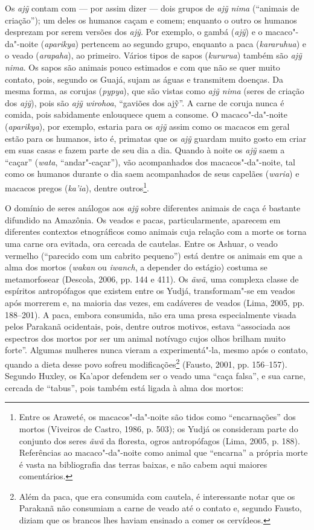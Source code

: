 Os \emph{ajỹ} contam com --- por assim dizer --- dois grupos de \emph{ajỹ
nima} (``animais de criação''); um deles os humanos caçam e comem;
enquanto o outro os humanos desprezam por serem versões dos \emph{ajỹ}.
Por exemplo, o gambá (\emph{ajỹ}) e o macaco"-da"-noite (\emph{aparikya})
pertencem ao segundo grupo, enquanto a paca (\emph{kararuhua}) e o veado
(\emph{arapaha}), ao primeiro. Vários tipos de sapos (\emph{kururua})
também são \emph{ajỹ nima}. Os sapos são animais pouco estimados e com
que não se quer muito contato, pois, segundo os Guajá, sujam as águas e
transmitem doenças. Da mesma forma, as corujas (\emph{pypya}), que são
vistas como \emph{ajỹ nima} (seres de criação dos \emph{ajỹ}), pois são
\emph{ajỹ wirohoa}, ``gaviões dos ajỹ''. A carne de coruja nunca é comida,
pois sabidamente enlouquece quem a consome. O macaco"-da"-noite
(\emph{aparikya}), por exemplo, estaria para os \emph{ajỹ} assim como os
macacos em geral estão para os humanos, isto é, primatas que os
\emph{ajỹ} guardam muito gosto em criar em suas casas e fazem parte de
seu dia a dia. Quando à noite os \emph{ajỹ} saem a ``caçar'' (\emph{wata},
``andar"-caçar''), vão acompanhados dos macacos"-da"-noite, tal como os
humanos durante o dia saem acompanhados de seus capelães (\emph{waria})
e macacos pregos (\emph{ka'ia}), dentre outros\footnote{Entre os
  Araweté, os macacos"-da"-noite são tidos como ``encarnações'' dos mortos
  (Viveiros de Castro, 1986, p. 503); os Yudjá os consideram parte do
  conjunto dos seres \emph{ãwã} da floresta, ogros antropófagos (Lima,
  2005, p. 188). Referências ao macaco"-da"-noite como animal que ``encarna'' a
  própria morte é vasta na bibliografia das terras baixas, e não cabem
  aqui maiores comentários.}.

O domínio de seres análogos aos \emph{ajỹ} sobre diferentes animais de
caça é bastante difundido na Amazônia. Os veados e pacas,
particularmente, aparecem em diferentes contextos etnográficos como
animais cuja relação com a morte os torna uma carne ora evitada, ora
cercada de cautelas. Entre os Ashuar, o veado vermelho (``parecido com um
cabrito pequeno'') está dentre os animais em que a alma dos mortos
(\emph{wakan} ou \emph{iwanch}, a depender do estágio) costuma se
metamorfosear (Descola, 2006, pp. 144 e 411). Os \emph{ãwã}, uma complexa
classe de espíritos antropófagos que existem entre os Yudjá,
transformam"-se em veados após morrerem e, na maioria das vezes, em
cadáveres de veados (Lima, 2005, pp. 188--201). A paca, embora consumida,
não era uma presa especialmente visada pelos Parakanã ocidentais, pois,
dentre outros motivos, estava ``associada aos espectros dos mortos por
ser um animal notívago cujos olhos brilham muito forte''. Algumas
mulheres nunca vieram a experimentá"-la, mesmo após o contato, quando a
dieta desse povo sofreu modificações\footnote{Além da paca, que era
  consumida com cautela, é interessante notar que os Parakanã não
  consumiam a carne de veado até o contato e, segundo Fausto, diziam que
  os brancos lhes haviam ensinado a comer os cervídeos.} (Fausto, 2001,
pp. 156--157). Segundo Huxley, os Ka'apor defendem ser o veado uma ``caça
falsa'', e sua carne, cercada de ``tabus'', pois também está ligada à alma
dos mortos:

